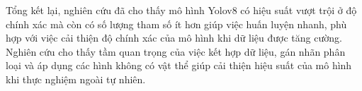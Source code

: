 \documentclass[../the.tex]{subfiles}
\begin{document}
\bigskip
    {\fontsize{13}{12} \selectfont
    Tổng kết lại, nghiên cứu đã cho thấy mô hình Yolov8 có hiệu suất vượt trội ở độ chính xác
    mà còn có số lượng tham số ít hơn giúp việc huấn luyện nhanh, phù hợp với việc cải thiện độ chính xác của mô hình khi dữ liệu được tăng cường.
    Nghiên cứu cho thấy tầm quan trọng của việc kết hợp dữ liệu, gán nhãn phân loại và áp dụng các hình không có vật thể giúp cải thiện hiệu suất của mô hình khi thực nghiệm ngoài tự nhiên.
}
\end{document}
